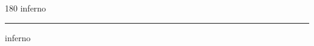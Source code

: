 
\begin{frame}
\begin{center}
\begin{turn}{180}
{\fontsize{2.5cm}{1em}\selectfont inferno}
\end{turn}
\vspace{1em}\par  
\hrule
\vspace{1em}\par  
{\fontsize{2.5cm}{1em}\selectfont inferno}
\end{center}
\end{frame}

